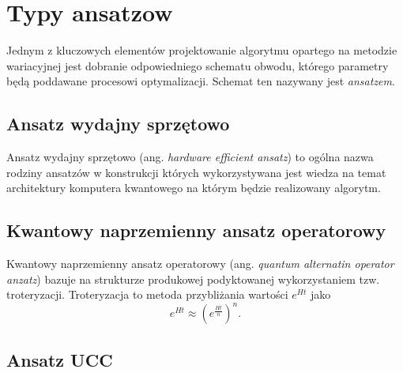 \documentclass[a4paper,11pt
]{article}
\newcommand{\ang}[1]{(ang. \emph{#1})}
\begin{document}
\hypertarget{typy-ansatzow}{%
	\section{Typy ansatzow}\label{typy-ansatzow}}


Jednym z kluczowych elementów projektowanie algorytmu opartego na metodzie wariacyjnej jest dobranie odpowiedniego schematu obwodu, którego parametry będą poddawane procesowi optymalizacji. Schemat ten nazywany jest \emph{ansatzem}.



\subsection{Ansatz wydajny sprzętowo}

Ansatz wydajny sprzętowo \ang{hardware efficient ansatz} to ogólna nazwa rodziny ansatzów w konstrukcji których wykorzystywana jest wiedza na temat architektury komputera kwantowego na którym będzie realizowany algorytm.


\subsection{Kwantowy naprzemienny ansatz operatorowy}

Kwantowy naprzemienny ansatz operatorowy \ang{quantum alternatin operator anzatz} bazuje na strukturze produkowej podyktowanej wykorzystaniem tzw. troteryzacji. Troteryzacja to metoda przybliżania wartości $e^{Ht}$ jako
\begin{equation}
	e^{Ht} \approx \left(e^{\frac{Ht}{n}}\right)^n.
\end{equation}


\subsection{Ansatz UCC}
\end{document}
